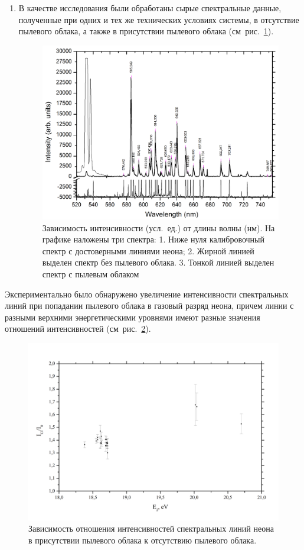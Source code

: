 \begin{enumerate}
    \item В качестве исследования были обработаны сырые спектральные данные, полученные при одних и тех же
    технических условиях системы, в отсутствие пылевого облака, а также в присутствии пылевого облака (см~рис.~\ref{fig:fig34}).
    \begin{figure}
        \centering
        \includegraphics[width=15cm]{figures/fig34}
        \caption{
            Зависимость интенсивности (усл.~ед.) от длины волны (нм). На графике наложены три спектра:
            1. Ниже нуля калибровочный спектр с достоверными линиями неона;
            2. Жирной линией выделен спектр без пылевого облака.
            3. Тонкой линией выделен спектр с пылевым облаком
        }
        \label{fig:fig34}
    \end{figure}
\end{enumerate}

Экспериментально было обнаружено увеличение интенсивности спектральных линий при попадании пылевого облака
в газовый разряд неона, причем линии с разными верхними энергетическими уровнями имеют разные значения
отношений интенсивностей (см~рис.~\ref{fig:fig35}).
\begin{figure}
    \centering
    \includegraphics[width=15cm]{figures/fig35}
    \caption{Зависимость отношения интенсивностей спектральных линий неона в присутствии пылевого облака к отсутствию пылевого облака.}
    \label{fig:fig35}
\end{figure}